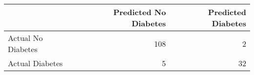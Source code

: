 \begin{tabular}{lrr}
\toprule
 & Predicted No Diabetes & Predicted Diabetes \\
\midrule
Actual No Diabetes & 108 & 2 \\
Actual Diabetes & 5 & 32 \\
\bottomrule
\end{tabular}
